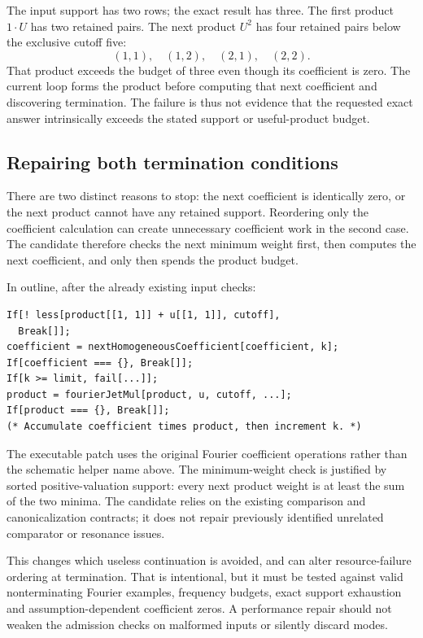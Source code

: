\documentclass[11pt,a4paper]{article}
\begin{document}
The input support has two rows; the exact result has three. The first product $1\cdot U$ has two retained pairs. The next product $U^2$ has four retained pairs below the exclusive cutoff five:
\[
 (1,1),\quad(1,2),\quad(2,1),\quad(2,2).
\]
That product exceeds the budget of three even though its coefficient is zero. The current loop forms the product before computing that next coefficient and discovering termination. The failure is thus not evidence that the requested exact answer intrinsically exceeds the stated support or useful-product budget.

\subsection{Repairing both termination conditions}
There are two distinct reasons to stop: the next coefficient is identically zero, or the next product cannot have any retained support. Reordering only the coefficient calculation can create unnecessary coefficient work in the second case. The candidate therefore checks the next minimum weight first, then computes the next coefficient, and only then spends the product budget.

In outline, after the already existing input checks:
\begin{lstlisting}
If[! less[product[[1, 1]] + u[[1, 1]], cutoff],
  Break[]];
coefficient = nextHomogeneousCoefficient[coefficient, k];
If[coefficient === {}, Break[]];
If[k >= limit, fail[...]];
product = fourierJetMul[product, u, cutoff, ...];
If[product === {}, Break[]];
(* Accumulate coefficient times product, then increment k. *)
\end{lstlisting}
The executable patch uses the original Fourier coefficient operations rather than the schematic helper name above. The minimum-weight check is justified by sorted positive-valuation support: every next product weight is at least the sum of the two minima. The candidate relies on the existing comparison and canonicalization contracts; it does not repair previously identified unrelated comparator or resonance issues.

This changes which useless continuation is avoided, and can alter resource-failure ordering at termination. That is intentional, but it must be tested against valid nonterminating Fourier examples, frequency budgets, exact support exhaustion and assumption-dependent coefficient zeros. A performance repair should not weaken the admission checks on malformed inputs or silently discard modes.
\end{document}
